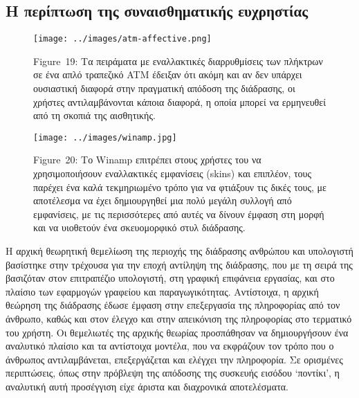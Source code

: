 \documentclass[
]{article}
\begin{document}
\hypertarget{ux3b7-ux3c0ux3b5ux3c1ux3afux3c0ux3c4ux3c9ux3c3ux3b7-ux3c4ux3b7ux3c2-ux3c3ux3c5ux3bdux3b1ux3b9ux3c3ux3b8ux3b7ux3bcux3b1ux3c4ux3b9ux3baux3aeux3c2-ux3b5ux3c5ux3c7ux3c1ux3b7ux3c3ux3c4ux3afux3b1ux3c2}{%
\subsection{Η περίπτωση της συναισθηματικής
ευχρηστίας}\label{ux3b7-ux3c0ux3b5ux3c1ux3afux3c0ux3c4ux3c9ux3c3ux3b7-ux3c4ux3b7ux3c2-ux3c3ux3c5ux3bdux3b1ux3b9ux3c3ux3b8ux3b7ux3bcux3b1ux3c4ux3b9ux3baux3aeux3c2-ux3b5ux3c5ux3c7ux3c1ux3b7ux3c3ux3c4ux3afux3b1ux3c2}}

\leavevmode{}%
\begin{figure}
\hypertarget{fig:atm-affective}{%
\centering
\texttt{[image: ../images/atm-affective.png]}
\caption{Figure~19: Τα πειράματα με εναλλακτικές διαρρυθμίσεις των
πλήκτρων σε ένα απλό τραπεζικό ATM έδειξαν ότι ακόμη και αν δεν υπάρχει
ουσιαστική διαφορά στην πραγματική απόδοση της διάδρασης, οι χρήστες
αντιλαμβάνονται κάποια διαφορά, η οποία μπορεί να ερμηνευθεί από τη
σκοπιά της αισθητικής.}\label{fig:atm-affective}
}
\end{figure}

\leavevmode{}%
\begin{figure}
\hypertarget{fig:winamp}{%
\centering
\texttt{[image: ../images/winamp.jpg]}
\caption{Figure~20: Το Winamp επιτρέπει στους χρήστες του να
χρησιμοποιήσουν εναλλακτικές εμφανίσεις (skins) και επιπλέον, τους
παρέχει ένα καλά τεκμηριωμένο τρόπο για να φτιάξουν τις δικές τους, με
αποτέλεσμα να έχει δημιουργηθεί μια πολύ μεγάλη συλλογή από εμφανίσεις,
με τις περισσότερες από αυτές να δίνουν έμφαση στη μορφή και να
υιοθετούν ένα σκευομορφικό στυλ διάδρασης.}\label{fig:winamp}
}
\end{figure}

Η αρχική θεωρητική θεμελίωση της περιοχής της διάδρασης ανθρώπου και
υπολογιστή βασίστηκε στην τρέχουσα για την εποχή αντίληψη της διάδρασης,
που με τη σειρά της βασιζόταν στον επιτραπέζιο υπολογιστή, στη γραφική
επιφάνεια εργασίας, και στο πλαίσιο των εφαρμογών γραφείου και
παραγωγικότητας. Αντίστοιχα, η αρχική θεώρηση της διάδρασης έδωσε έμφαση
στην επεξεργασία της πληροφορίας από τον άνθρωπο, καθώς και στον έλεγχο
και στην απεικόνιση της πληροφορίας στο τερματικό του χρήστη. Οι
θεμελιωτές της αρχικής θεωρίας προσπάθησαν να δημιουργήσουν ένα
αναλυτικό πλαίσιο και τα αντίστοιχα μοντέλα, που να εκφράζουν τον τρόπο
που ο άνθρωπος αντιλαμβάνεται, επεξεργάζεται και ελέγχει την πληροφορία.
Σε ορισμένες περιπτώσεις, όπως στην πρόβλεψη της απόδοσης της συσκευής
εισόδου `ποντίκι', η αναλυτική αυτή προσέγγιση είχε άριστα και
διαχρονικά αποτελέσματα.
\end{document}
